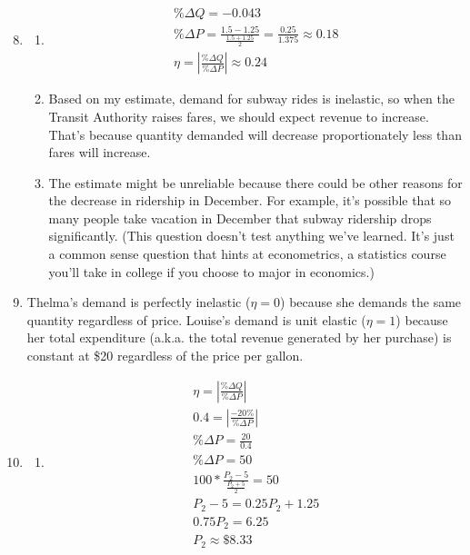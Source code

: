 \documentclass{article}
\begin{document}
\begin{enumerate}
\setcounter{enumi}{7}

\item

	\begin{enumerate}
	
	\item 
	
		\begin{gather*}
		\% \Delta Q = -0.043 \\
		\% \Delta P = \frac{1.5 - 1.25}{\frac{1.5 + 1.25}{2}} = \frac{0.25}{1.375} \approx 0.18 \\
		\eta = \left| \frac{\% \Delta Q}{\% \Delta P} \right| \approx 0.24
		\end{gather*}
		
	\item Based on my estimate, demand for subway rides is inelastic, so when the Transit Authority raises fares, we should expect revenue to increase. That's because quantity demanded will decrease proportionately less than fares will increase. 
	
	\item The estimate might be unreliable because there could be other reasons for the decrease in ridership in December. For example, it's possible that so many people take vacation in December that subway ridership drops significantly. (This question doesn't test anything we've learned. It's just a common sense question that hints at econometrics, a statistics course you'll take in college if you choose to major in economics.) 
	
	\end{enumerate} 
	
\item Thelma's demand is perfectly inelastic ($\eta = 0$) because she demands the same quantity regardless of price. Louise's demand is unit elastic ($\eta = 1$) because her total expenditure (a.k.a. the total revenue generated by her purchase) is constant at \$20 regardless of the price per gallon. 

\item

	\begin{enumerate}
	
	\item 
	
		\begin{gather*}
		\eta = \left| \frac{\% \Delta Q}{\% \Delta P} \right| \\
		0.4 = \left| \frac{-20 \%}{\% \Delta P} \right| \\
		\% \Delta P = \frac{20}{0.4} \\
		\% \Delta P = 50 \\
		100 * \frac{P_2 - 5}{\frac{P_2 + 5}{2}} = 50 \\
		P_2 - 5 = 0.25P_2 + 1.25 \\
		0.75P_2 = 6.25 \\
		P_2 \approx \$8.33
		\end{gather*}
		

\end{enumerate}
\end{enumerate}
\end{document}
